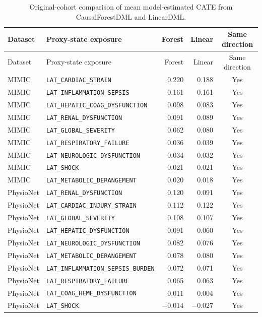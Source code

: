 \begingroup
\scriptsize
\setlength{\tabcolsep}{4pt}
\begin{longtable}{@{}lL{0.43\textwidth}rrc@{}}
\caption[Original-cohort Forest and Linear comparison.]{Original-cohort comparison of mean model-estimated CATE from CausalForestDML and LinearDML.}
\label{tab:results-linear-comparison}\\
\toprule
Dataset & Proxy-state exposure & Forest & Linear & Same direction \\
\midrule
\endfirsthead
\toprule
Dataset & Proxy-state exposure & Forest & Linear & Same direction \\
\midrule
\endhead
MIMIC & \nolinkurl{LAT_CARDIAC_STRAIN} & 0.220 & 0.188 & Yes \\
MIMIC & \nolinkurl{LAT_INFLAMMATION_SEPSIS} & 0.161 & 0.161 & Yes \\
MIMIC & \nolinkurl{LAT_HEPATIC_COAG_DYSFUNCTION} & 0.098 & 0.083 & Yes \\
MIMIC & \nolinkurl{LAT_RENAL_DYSFUNCTION} & 0.091 & 0.089 & Yes \\
MIMIC & \nolinkurl{LAT_GLOBAL_SEVERITY} & 0.062 & 0.080 & Yes \\
MIMIC & \nolinkurl{LAT_RESPIRATORY_FAILURE} & 0.036 & 0.039 & Yes \\
MIMIC & \nolinkurl{LAT_NEUROLOGIC_DYSFUNCTION} & 0.034 & 0.032 & Yes \\
MIMIC & \nolinkurl{LAT_SHOCK} & 0.021 & 0.021 & Yes \\
MIMIC & \nolinkurl{LAT_METABOLIC_DERANGEMENT} & 0.020 & 0.018 & Yes \\
\addlinespace
PhysioNet & \nolinkurl{LAT_RENAL_DYSFUNCTION} & 0.120 & 0.091 & Yes \\
PhysioNet & \nolinkurl{LAT_CARDIAC_INJURY_STRAIN} & 0.112 & 0.122 & Yes \\
PhysioNet & \nolinkurl{LAT_GLOBAL_SEVERITY} & 0.108 & 0.107 & Yes \\
PhysioNet & \nolinkurl{LAT_HEPATIC_DYSFUNCTION} & 0.091 & 0.060 & Yes \\
PhysioNet & \nolinkurl{LAT_NEUROLOGIC_DYSFUNCTION} & 0.082 & 0.076 & Yes \\
PhysioNet & \nolinkurl{LAT_METABOLIC_DERANGEMENT} & 0.078 & 0.080 & Yes \\
PhysioNet & \nolinkurl{LAT_INFLAMMATION_SEPSIS_BURDEN} & 0.072 & 0.071 & Yes \\
PhysioNet & \nolinkurl{LAT_RESPIRATORY_FAILURE} & 0.065 & 0.063 & Yes \\
PhysioNet & \nolinkurl{LAT_COAG_HEME_DYSFUNCTION} & 0.011 & 0.004 & Yes \\
PhysioNet & \nolinkurl{LAT_SHOCK} & $-0.014$ & $-0.027$ & Yes \\
\bottomrule
\end{longtable}
\endgroup


